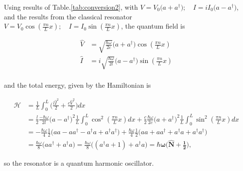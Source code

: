    Using      results     of      Table.\ref{tab:conversion2},     with
   $      V      =       V_0\bigg(a+a^\dagger\bigg);\quad      I      =
   iI_0\bigg(a-a^\dagger\bigg) $,  and the  results from  the classical
   resonator
   $ V=V_0\cos(\frac{\pi  n}{L}x);\quad I=I_0\sin(\frac{\pi n}{L}x)  $, the
   quantum field is

   \begin{align}
     \hat{V} & = \sqrt{\frac{\hbar\omega}{2c}}\bigg(a+a^\dagger\bigg)\cos(\frac{\pi n}{L}x)\\
     \hat{I} & = i\sqrt{\frac{\hbar\omega}{2l}}\bigg(a-a^\dagger\bigg)\sin(\frac{\pi n}{L}x)\\
   \end{align}

   \noindent and the total energy, given by the Hamiltonian is

   \begin{equation}\label{tlineTOtalGamil}
     \begin{aligned}
       \mathcal{H} & = \frac{1}{L}\int_{0}^{L}\bigg(\frac{l\hat{I}^2}{2}+\frac{c\hat{V}^2}{2}\bigg)dx \\
       & = \frac{l}{2}\frac{-\hbar\omega}{2l}\bigg(a-a^{\dagger}\bigg)^2\frac{1}{L}\int_{0}^{L}\cos^2(\frac{\pi n}{L}x)dx + \frac{c}{2}\frac{\hbar\omega}{2c}\bigg(a+a^{\dagger}\bigg)^2\frac{1}{L}\int_{0}^{L}\sin^2(\frac{\pi n}{L}x)dx\\
       & = -\frac{\hbar\omega}{4}\frac{1}{2}\bigg(aa-aa^{\dagger}-a^{\dagger}a+a^{\dagger}a^{\dagger}\bigg)+\frac{\hbar\omega}{4}\frac{1}{2}\bigg(aa+aa^{\dagger}+a^{\dagger}a+a^{\dagger}a^{\dagger}\bigg)\\
       &        =       \frac{\hbar\omega}{8}\bigg(aa^{\dagger}+a^{\dagger}a\bigg)=
       \frac{\hbar\omega}{8}\bigg((a^{\dagger}a+1)+a^{\dagger}a\bigg)=\mathbf{\hbar\omega\bigg(\hat{N}+\frac{1}{2}\bigg)},
     \end{aligned}
   \end{equation}

   \noindent so the resonator is a quantum harmonic oscillator.

   \newpage
